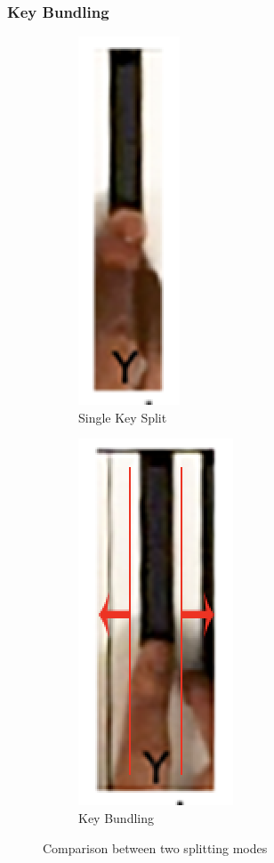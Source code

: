 \documentclass[10pt,twocolumn,letterpaper]{article}
\begin{document}
\subsubsection{Key Bundling}

\begin{figure}[h!]
   \begin{subfigure}{0.2\textwidth}
      \centering
      \includegraphics[width=0.26\linewidth]{fig/15.png}
      \caption{Single Key Split} \label{fig:k}
    \end{subfigure}\hspace*{\fill}
    \begin{subfigure}{0.2\textwidth}
      \centering
      \includegraphics[width=0.4\linewidth]{fig/14.png}
      \caption{Key Bundling} \label{fig:l}
    \end{subfigure}
   \caption{Comparison between two splitting modes} \label{fig:4}
\end{figure}   
\end{document}
